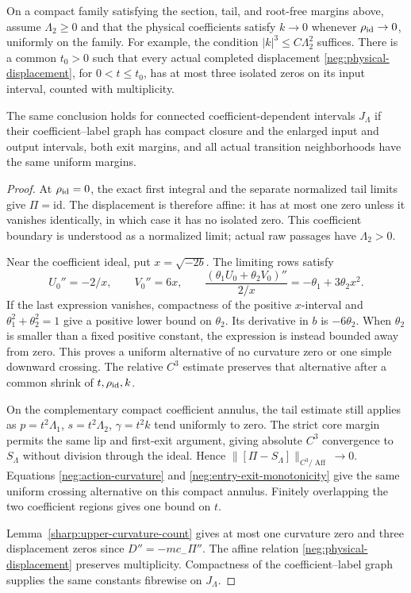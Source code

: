 \begin{corollary}\label{neg:cor-rootfree}
On a compact family satisfying the section, tail, and root-free
margins above, assume \(\Lambda_2\ge0\) and that the physical
coefficients satisfy \(k\to0\) whenever
\(\rho_{\rm id}\to0\), uniformly on the family. For example,
the condition \(|k|^3\le C\Lambda_2^2\) suffices.
There is a common \(t_0>0\) such that every actual completed
displacement \eqref{neg:physical-displacement}, for
\(0<t\le t_0\), has at most three isolated zeros on its input
interval, counted with multiplicity.

The same conclusion holds for connected coefficient-dependent
intervals \(J_\Lambda\) if their coefficient--label graph has
compact closure and the enlarged input and output intervals, both
exit margins, and all actual transition neighborhoods have the
same uniform margins.
\end{corollary}
\begin{proof}
At \(\rho_{\rm id}=0\), the exact first integral and the separate
normalized tail limits give \(\Pi=\mathrm{id}\). The displacement
is therefore affine: it has at most one zero unless it vanishes
identically, in which case it has no isolated zero. This coefficient
boundary is understood as a normalized limit; actual raw passages
have \(\Lambda_2>0\).

Near the coefficient ideal, put \(x=\sqrt{-2b}\). The limiting
rows satisfy
\[
 U_0''=-2/x,\qquad V_0''=6x,\qquad
 \frac{(\theta_1U_0+\theta_2V_0)''}{2/x}
                   =-\theta_1+3\theta_2x^2 .
\]
If the last expression vanishes, compactness of the positive
\(x\)-interval and \(\theta_1^2+\theta_2^2=1\) give a
positive lower bound on \(\theta_2\). Its derivative in \(b\)
is \(-6\theta_2\). When \(\theta_2\) is smaller than a fixed
positive constant, the expression is instead bounded away from
zero. This proves a uniform alternative of no curvature zero or
one simple downward crossing. The relative \(C^3\) estimate
preserves that alternative after a common shrink of
\(t,\rho_{\rm id},k\).

On the complementary compact coefficient annulus, the tail estimate
still applies as \(p=t^2\Lambda_1\), \(s=t^2\Lambda_2\),
\(\gamma=t^2k\) tend uniformly to zero. The strict core margin permits
the same lip and first-exit argument, giving absolute \(C^3\)
convergence to \(S_\Lambda\) without division through the ideal. Hence
\(\|[\Pi-S_\Lambda]\|_{C^3/\operatorname{Aff}}\to0\).
Equations \eqref{neg:action-curvature} and
\eqref{neg:entry-exit-monotonicity} give the same uniform crossing
alternative on this compact annulus. Finitely overlapping the two
coefficient regions gives one bound on \(t\).

Lemma~\ref{sharp:upper-curvature-count} gives at most one curvature
zero and three displacement zeros since \(D''=-mc_-\Pi''\).
The affine relation \eqref{neg:physical-displacement} preserves
multiplicity. Compactness of the coefficient--label graph supplies
the same constants fibrewise on \(J_\Lambda\).
\end{proof}
